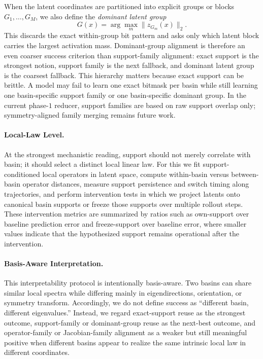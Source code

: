 When the latent coordinates are partitioned into explicit groups or blocks
$G_1,\dots,G_M$, we also define the \emph{dominant latent group}
\begin{equation}
    G(x) = \arg\max_{m} \|z_{G_m}(x)\|_2 .
\end{equation}
This discards the exact within-group bit pattern and asks only which latent
block carries the largest activation mass. Dominant-group alignment is
therefore an even coarser success criterion than support-family alignment:
exact support is the strongest notion, support family is the next fallback,
and dominant latent group is the coarsest fallback. This hierarchy matters
because exact support can be brittle. A model may fail to learn one exact
bitmask per basin while still learning one basin-specific support family or
one basin-specific dominant group. In the current phase-$1$ reducer, support
families are based on raw support overlap only; symmetry-aligned family
merging remains future work.

\paragraph{Local-Law Level.}
At the strongest mechanistic reading, support should not merely correlate with
basin; it should select a distinct local linear law. For this we fit
support-conditioned local operators in latent space, compute within-basin
versus between-basin operator distances, measure support persistence and
switch timing along trajectories, and perform intervention tests in which we
project latents onto canonical basin supports or freeze those supports over
multiple rollout steps. These intervention metrics are summarized by ratios
such as own-support over baseline prediction error and freeze-support over
baseline error, where smaller values indicate that the hypothesized support
remains operational after the intervention.

\paragraph{Basis-Aware Interpretation.}
This interpretability protocol is intentionally basis-aware. Two basins can
share similar local spectra while differing mainly in eigendirections,
orientation, or symmetry transform. Accordingly, we do not define success as
``different basin, different eigenvalues.'' Instead, we regard exact-support
reuse as the strongest outcome, support-family or dominant-group reuse as the
next-best outcome, and operator-family or Jacobian-family alignment as a
weaker but still meaningful positive when different basins appear to realize
the same intrinsic local law in different coordinates.

